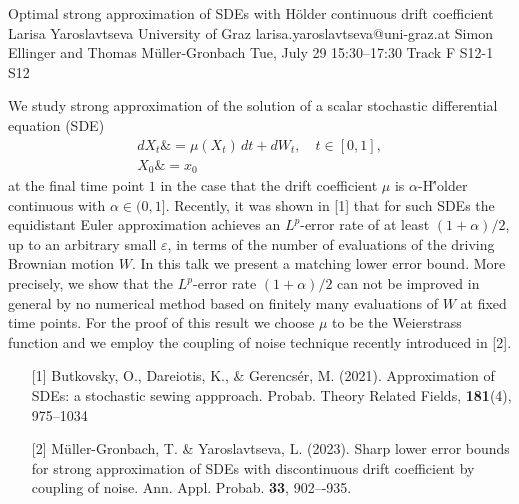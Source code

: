 \begin{talk}
  {Optimal strong approximation of SDEs with H\"older continuous drift coefficient}%
  {Larisa Yaroslavtseva}%
  {University of Graz}%
  {larisa.yaroslavtseva@uni-graz.at}%
  {Simon Ellinger and Thomas Müller-Gronbach}%
  {}%
  {Tue, July 29 15:30–17:30 Track F}%
  {S12-1}%
  {S12}%
  
				
			
We study strong approximation of the solution of a scalar stochastic differential equation (SDE)
\begin{equation}\label{sde0}
	\begin{aligned}
		dX_t \& = \mu(X_t) \, dt +  dW_t, \quad t\in [0,1],\\
		X_0 \& = x_0
	\end{aligned}
\end{equation}
at the final time point $1$
in the case that  the drift coefficient  $\mu$ is $\alpha$-H\''older continuous with $\alpha\in(0, 1]$.
Recently, it was  shown in [1] that for such SDEs the equidistant Euler approximation achieves an $L^p$-error rate of at least $(1+\alpha)/2$, up to an arbitrary small $\varepsilon$,
in terms of the number of evaluations of the driving Brownian motion $W$.
In this talk  we  
present a matching  lower error bound.   More precisely, we show that
the $L^p$-error rate $(1+\alpha)/2$ can
not be improved in general by  no numerical 
method based on finitely many evaluations of $W$ at fixed time points. For the proof of this result we choose  $\mu$ to be the Weierstrass function and we employ  the coupling of noise technique  recently introduced in [2].




\begin{enumerate}
	\item[{[1]}] Butkovsky, O., Dareiotis, K., \& Gerencs\'er, M. (2021). Approximation of SDEs: a stochastic sewing appproach. Probab. Theory Related Fields, \textbf{181}(4), 975--1034
	\item[{[2]}] Müller-Gronbach, T.  \& Yaroslavtseva, L. (2023). Sharp lower error bounds for strong approximation of
	SDEs with discontinuous drift coefficient by coupling of noise. Ann. Appl. Probab. \textbf{33}, 902–-935.
\end{enumerate}


\end{talk}

